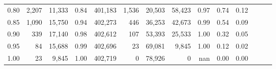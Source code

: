 \begin{tabular}{rrrrrrrrrrrrrr}
0.80 &   2,207 &  11,333 &  0.84 &  401,183 &    1,536 &  20,503 &  58,423 &  0.97 &  0.74 &      0.12 \\
0.85 &   1,090 &  15,750 &  0.94 &  402,273 &      446 &  36,253 &  42,673 &  0.99 &  0.54 &      0.09 \\
0.90 &     339 &  17,140 &  0.98 &  402,612 &      107 &  53,393 &  25,533 &  1.00 &  0.32 &      0.05 \\
0.95 &      84 &  15,688 &  0.99 &  402,696 &       23 &  69,081 &   9,845 &  1.00 &  0.12 &      0.02 \\
1.00 &      23 &   9,845 &  1.00 &  402,719 &        0 &  78,926 &       0 &   nan &  0.00 &      0.00 \\
\bottomrule
\end{tabular}
